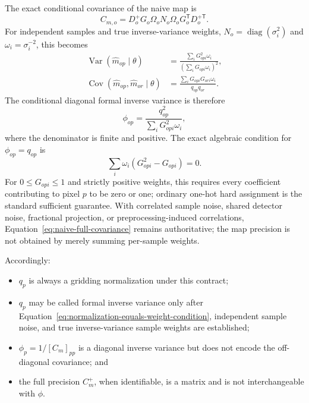 \documentclass[11pt]{article}
\newcommand{\Cov}{\operatorname{Cov}}
\newcommand{\Var}{\operatorname{Var}}
\newcommand{\diag}{\operatorname{diag}}
\newcommand{\trans}{\mathsf{T}}
\begin{document}
The exact conditional covariance of the naive map is
\begin{equation}
 C_{m,o}=D_o^{+}G_o\Omega_o N_o\Omega_o
 G_o^\trans D_o^{+\trans}.
 \label{eq:naive-full-covariance}
\end{equation}
For independent samples and true inverse-variance weights,
\(N_o=\diag(\sigma_i^2)\) and \(\omega_i=\sigma_i^{-2}\), this becomes
\begin{align}
 \Var(\widehat m_{op}\mid\theta)
 &=\frac{\sum_iG_{opi}^2\omega_i}
         {\left(\sum_iG_{opi}\omega_i\right)^2},
 \label{eq:fractional-map-variance}\\
 \Cov(\widehat m_{op},\widehat m_{or}\mid\theta)
 &=\frac{\sum_iG_{opi}G_{ori}\omega_i}
         {q_{op}q_{or}}.
 \label{eq:fractional-cross-pixel-covariance}
\end{align}
The conditional diagonal formal inverse variance is therefore
\begin{equation}
 \phi_{op}=\frac{q_{op}^2}{\sum_iG_{opi}^2\omega_i},
 \label{eq:formal-diagonal-weight}
\end{equation}
where the denominator is finite and positive. The exact algebraic condition
for \(\phi_{op}=q_{op}\) is
\begin{equation}
 \sum_i\omega_i\left(G_{opi}^2-G_{opi}\right)=0.
 \label{eq:normalization-equals-weight-condition}
\end{equation}
For \(0\leq G_{opi}\leq1\) and strictly positive weights, this requires every
coefficient contributing to pixel \(p\) to be zero or one; ordinary one-hot
hard assignment is the standard sufficient guarantee. With correlated sample noise,
shared detector noise, fractional projection, or preprocessing-induced
correlations, Equation~\eqref{eq:naive-full-covariance} remains authoritative;
the map precision is not obtained by merely summing per-sample weights.

Accordingly:
\begin{itemize}
\item \(q_p\) is always a gridding normalization under this contract;
\item \(q_p\) may be called formal inverse variance only after
Equation~\eqref{eq:normalization-equals-weight-condition}, independent sample
noise, and true inverse-variance sample weights are established;
\item \(\phi_p=1/[C_m]_{pp}\) is a diagonal inverse variance but does not encode
the off-diagonal covariance; and
\item the full precision \(C_m^{+}\), when identifiable, is a matrix and is not
interchangeable with \(\phi\).
\end{itemize}
\end{document}
